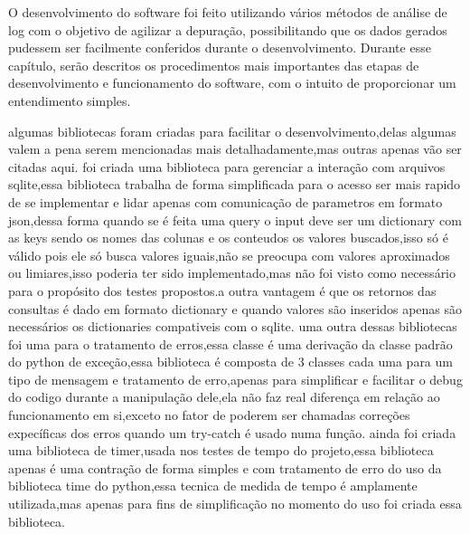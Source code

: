 \documentclass[
	12pt,				%
	openright,			%
	oneside,			%
	a4paper,			%
	english,			%
	french,				%
	spanish,			%
	brazil,				%
	]{abntex2}
\begin{document}
O desenvolvimento do software foi feito utilizando vários métodos de análise de log com o objetivo de agilizar a depuração, possibilitando que os dados gerados pudessem ser facilmente conferidos durante o desenvolvimento.\newline
Durante esse capítulo, serão descritos os procedimentos mais importantes das etapas de desenvolvimento e funcionamento do software, com o intuito de proporcionar um entendimento simples.\newline

algumas bibliotecas foram criadas para facilitar o desenvolvimento,delas algumas valem a pena serem mencionadas mais detalhadamente,mas outras apenas vão ser citadas aqui.
foi criada uma biblioteca para gerenciar a interação com arquivos sqlite,essa biblioteca trabalha de forma simplificada para o acesso ser mais rapido de se implementar e lidar apenas com comunicação de parametros em formato json,dessa forma quando se é feita uma query o input deve ser um dictionary com as keys sendo os nomes das colunas e os conteudos os valores buscados,isso só é válido pois ele só busca valores iguais,não se preocupa com valores aproximados ou limiares,isso poderia ter sido implementado,mas não foi visto como necessário para o propósito dos testes propostos.a outra vantagem é que os retornos das consultas é dado em formato dictionary e quando valores são inseridos apenas são necessários os dictionaries compativeis com o sqlite.
uma outra dessas bibliotecas foi uma para o tratamento de erros,essa classe é uma derivação da classe padrão do python de exceção,essa biblioteca é composta de 3 classes cada uma para um tipo de mensagem e tratamento de erro,apenas para simplificar e facilitar o debug do codigo durante a manipulação dele,ela não faz real diferença em relação ao funcionamento em si,exceto no fator de poderem ser chamadas correções expecíficas dos erros quando um try-catch é usado numa função.
ainda foi criada uma biblioteca de timer,usada nos testes de tempo do projeto,essa biblioteca apenas é uma contração de forma simples e com tratamento de erro do uso da biblioteca time do python,essa tecnica de medida de tempo é amplamente utilizada,mas apenas para fins de simplificação no momento do uso foi criada essa biblioteca.
\end{document}
